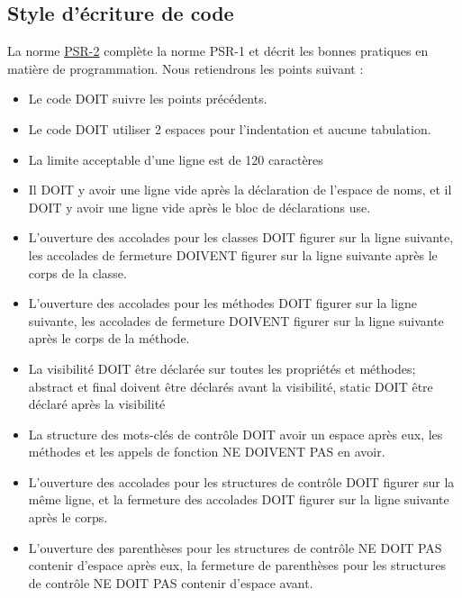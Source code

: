 \subsection{Style d'écriture de code}
La norme \href{http://www.php-fig.org/psr/psr-2/}{PSR-2} complète la norme PSR-1 et décrit les bonnes pratiques en matière de programmation. Nous retiendrons les points suivant :
\begin{itemize}[label=\textbullet]
  \item Le code DOIT suivre les points précédents.
  \item Le code DOIT utiliser 2 espaces pour l'indentation et aucune tabulation.
  \item La limite acceptable d'une ligne est de 120 caractères
  \item Il DOIT y avoir une ligne vide après la déclaration de l'espace de noms, et il DOIT y avoir une ligne vide après le bloc de déclarations use.
  \item L'ouverture des accolades pour les classes DOIT figurer sur la ligne suivante, les accolades de fermeture DOIVENT figurer sur la ligne suivante après le corps de la classe.
  \item L'ouverture des accolades pour les méthodes DOIT figurer sur la ligne suivante, les accolades de fermeture DOIVENT figurer sur la ligne suivante après le corps de la méthode.
  \item La visibilité DOIT être déclarée sur toutes les propriétés et méthodes; abstract et final doivent être déclarés avant la visibilité, static DOIT être déclaré après la visibilité
  \item La structure des mots-clés de contrôle DOIT avoir un espace après eux, les méthodes et les appels de fonction NE DOIVENT PAS en avoir.
  \item L'ouverture des accolades pour les structures de contrôle DOIT figurer sur la même ligne, et la fermeture des accolades DOIT figurer sur la ligne suivante après le corps.
  \item L'ouverture des parenthèses pour les structures de contrôle NE DOIT PAS contenir d'espace après eux, la fermeture de parenthèses pour les structures de contrôle NE DOIT PAS contenir d'espace avant.
\end{itemize}

